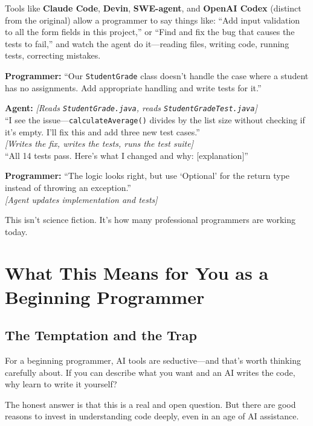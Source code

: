 \documentclass[11pt,letterpaper]{article}
\begin{document}
Tools like \textbf{Claude Code}, \textbf{Devin}, \textbf{SWE-agent}, and \textbf{OpenAI Codex} (distinct from the original) allow a programmer to say things like: ``Add input validation to all the form fields in this project,'' or ``Find and fix the bug that causes the tests to fail,'' and watch the agent do it---reading files, writing code, running tests, correcting mistakes.

\begin{quotebox}
\small
\textbf{Programmer:} ``Our \texttt{StudentGrade} class doesn't handle the case where a student has no assignments. Add appropriate handling and write tests for it.''

\textbf{Agent:} \textit{[Reads \texttt{StudentGrade.java}, reads \texttt{StudentGradeTest.java}]}\\
``I see the issue---\texttt{calculateAverage()} divides by the list size without checking if it's empty. I'll fix this and add three new test cases.''\\
\textit{[Writes the fix, writes the tests, runs the test suite]}\\
``All 14 tests pass. Here's what I changed and why: [explanation]''

\textbf{Programmer:} ``The logic looks right, but use `Optional' for the return type instead of throwing an exception.''\\
\textit{[Agent updates implementation and tests]}
\end{quotebox}

This isn't science fiction. It's how many professional programmers are working today.

\section{What This Means for You as a Beginning Programmer}

\subsection{The Temptation and the Trap}

For a beginning programmer, AI tools are seductive---and that's worth thinking carefully about. If you can describe what you want and an AI writes the code, why learn to write it yourself?

The honest answer is that this is a real and open question. But there are good reasons to invest in understanding code deeply, even in an age of AI assistance.
\end{document}
